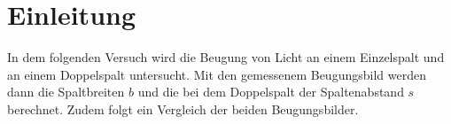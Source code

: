 \section{Einleitung}
\label{sec:einleitung}
In dem folgenden Versuch wird die Beugung von Licht an einem Einzelspalt und an einem Doppelspalt untersucht. Mit den gemessenem Beugungsbild
werden dann die Spaltbreiten $b$ und die bei dem Doppelspalt der Spaltenabstand $s$ berechnet. Zudem folgt ein Vergleich der beiden Beugungsbilder.

